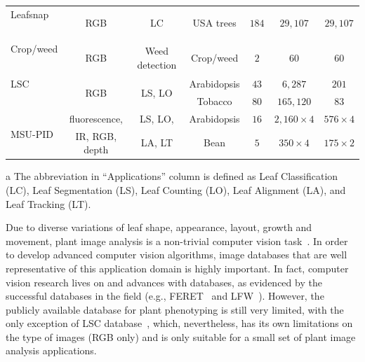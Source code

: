 \begin{table}[t!]
\begin{threeparttable}
\begin{tabular}{l|c|c|c|c|c|c}
Leafsnap & \multirow{2}{*}{RGB} & \multirow{2}{*}{LC} & \multirow{2}{*}{USA trees} & \multirow{2}{*}{$184$} & \multirow{2}{*}{$29,107$} & \multirow{2}{*}{$29,107$} \\
~\cite{kumar2012leafsnap} & & & & & & \\ \hline
Crop/weed & \multirow{2}{*}{RGB} & \multirow{2}{*}{Weed detection} & \multirow{2}{*}{Crop/weed} & \multirow{2}{*}{$2$} & \multirow{2}{*}{$60$} & \multirow{2}{*}{$60$} \\
~\cite{haug2014crop} & & & & & & \\ \hline
LSC & \multirow{2}{*}{RGB} & \multirow{2}{*}{LS, LO} & Arabidopsis & $43$ & $6,287$ & $201$ \\ \cline{4-7}
~\cite{haug2014crop} & & & Tobacco & $80$ & $165,120$ & $83$ \\ \hline
\multirow{2}{*}{MSU-PID} & fluorescence, & LS, LO, & Arabidopsis & $16$ & $2,160\times 4$ & $576\times 4$ \\ \cline{4-7}
& IR, RGB, depth & LA, LT & Bean & $5$ & $350\times 4$ & $175\times 2$ \\ \hline
\hline
\end{tabular}
\begin{tablenotes}
\footnotesize
\item[a] The abbreviation in ``Applications'' column is defined as Leaf Classification (LC), Leaf Segmentation (LS), Leaf Counting (LO), Leaf Alignment (LA), and Leaf Tracking (LT).
\end{tablenotes}
\end{threeparttable}
\label{tab:database}
\end{table}

Due to diverse variations of leaf shape, appearance, layout, growth and movement, plant image analysis is a non-trivial computer vision task~\cite{Minervini2015}.
In order to develop advanced computer vision algorithms, image databases that are well representative of this application domain is highly important.
In fact, computer vision research lives on and advances with databases, as evidenced by the successful databases in the field (e.g., FERET~\cite{Phillips2000} and LFW~\cite{LFW}).
However, the publicly available database for plant phenotyping is still very limited, with the only exception of LSC database~\cite{scharr2014annotated}, which, nevertheless, has its own limitations on the type of images (RGB only) and is only suitable for a small set of plant image analysis applications.



